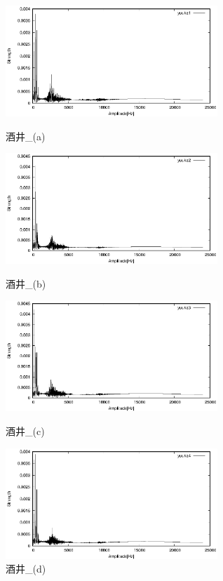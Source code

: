 \documentclass[titlepage]{jarticle}
\begin{document}
\begin{figure}[H]
  \begin{minipage}{0.495\hsize}
    \centering
    \includegraphics[width=8cm]{img/yuuka1.eps}
    \caption{酒井\_(a)}
    \label{yuuka1}
  \end{minipage}
  \begin{minipage}{0.495\hsize}
    \centering
    \includegraphics[width=8cm]{img/yuuka2.eps}
    \caption{酒井\_(b)}
    \label{yuuka2}
  \end{minipage}


  \begin{minipage}{0.495\hsize}
    \centering
    \includegraphics[width=8cm]{img/yuuka3.eps}
    \caption{酒井\_(c)}
    \label{yuuka3}
  \end{minipage}
  \begin{minipage}{0.495\hsize}
    \centering
    \includegraphics[width=8cm]{img/yuuka4.eps}
    \caption{酒井\_(d)}
    \label{yuuka4}
  \end{minipage}
\end{figure}
\end{document}
